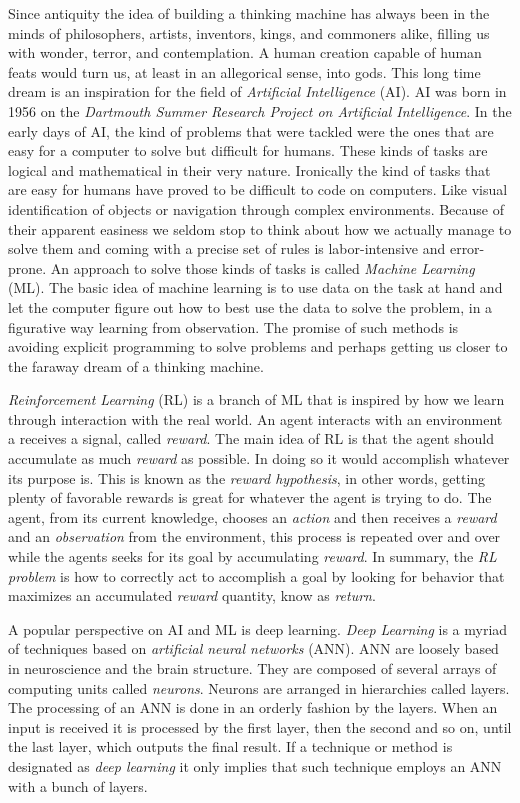 \documentclass[
  12pt,
  openany]{book}
\begin{document}
Since antiquity the idea of building a thinking machine has always been in the minds of philosophers, artists, inventors, kings, and commoners alike, filling us with wonder, terror, and contemplation. A human creation capable of human feats would turn us, at least in an allegorical sense, into gods. This long time dream is an inspiration for the field of \emph{Artificial Intelligence} (AI). AI was born in 1956 on the \emph{Dartmouth Summer Research Project on Artificial Intelligence}. In the early days of AI, the kind of problems that were tackled were the ones that are easy for a computer to solve but difficult for humans. These kinds of tasks are logical and mathematical in their very nature. Ironically the kind of tasks that are easy for humans have proved to be difficult to code on computers. Like visual identification of objects or navigation through complex environments. Because of their apparent easiness we seldom stop to think about how we actually manage to solve them and coming with a precise set of rules is labor-intensive and error-prone. An approach to solve those kinds of tasks is called \emph{Machine Learning} (ML). The basic idea of machine learning is to use data on the task at hand and let the computer figure out how to best use the data to solve the problem, in a figurative way learning from observation. The promise of such methods is avoiding explicit programming to solve problems and perhaps getting us closer to the faraway dream of a thinking machine.

\emph{Reinforcement Learning} (RL) is a branch of ML that is inspired by how we learn through interaction with the real world. An agent interacts with an environment a receives a signal, called \emph{reward}. The main idea of RL is that the agent should accumulate as much \emph{reward} as possible. In doing so it would accomplish whatever its purpose is. This is known as the \emph{reward hypothesis}, in other words, getting plenty of favorable rewards is great for whatever the agent is trying to do. The agent, from its current knowledge, chooses an \emph{action} and then receives a \emph{reward} and an \emph{observation} from the environment, this process is repeated over and over while the agents seeks for its goal by accumulating \emph{reward}. In summary, the \emph{RL problem} is how to correctly act to accomplish a goal by looking for behavior that maximizes an accumulated \emph{reward} quantity, know as \emph{return}.

A popular perspective on AI and ML is deep learning. \emph{Deep Learning} is a myriad of techniques based on \emph{artificial neural networks} (ANN). ANN are loosely based in neuroscience and the brain structure. They are composed of several arrays of computing units called \emph{neurons}. Neurons are arranged in hierarchies called layers. The processing of an ANN is done in an orderly fashion by the layers. When an input is received it is processed by the first layer, then the second and so on, until the last layer, which outputs the final result. If a technique or method is designated as \emph{deep learning} it only implies that such technique employs an ANN with a bunch of layers.
\end{document}
